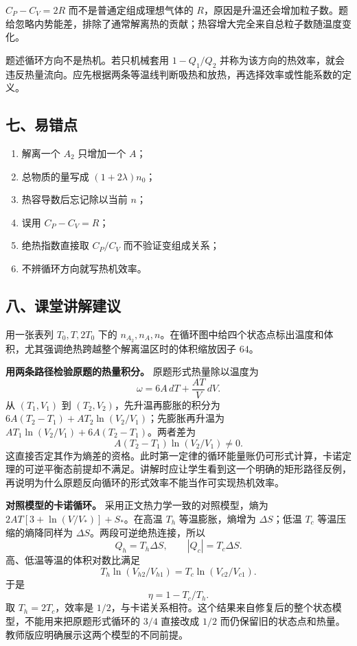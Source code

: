 \documentclass[12pt,a4paper,UTF8]{ctexart}
\newcommand{\tightlist}{\setlength{\itemsep}{0pt}\setlength{\parskip}{0pt}}
\begin{document}
\(C_P-C_V=2R\) 而不是普通定组成理想气体的
\(R\)，原因是升温还会增加粒子数。题给忽略内势能差，排除了通常解离热的贡献；热容增大完全来自总粒子数随温度变化。

题述循环方向不是热机。若只机械套用 \(1-Q_1/Q_2\)
并称为该方向的热效率，就会违反热量流向。应先根据两条等温线判断吸热和放热，再选择效率或性能系数的定义。

\subsection{七、易错点}\label{ux4e03ux6613ux9519ux70b9-5}

\begin{enumerate}
\def\labelenumi{\arabic{enumi}.}
\tightlist
\item
  解离一个 \(A_2\) 只增加一个 \(A\)；
\item
  总物质的量写成 \((1+2\lambda)n_0\)；
\item
  热容导数后忘记除以当前 \(n\)；
\item
  误用 \(C_P-C_V=R\)；
\item
  绝热指数直接取 \(C_P/C_V\) 而不验证变组成关系；
\item
  不辨循环方向就写热机效率。
\end{enumerate}

\subsection{八、课堂讲解建议}\label{ux516bux8bfeux5802ux8bb2ux89e3ux5efaux8bae-5}

用一张表列 \(T_0,T,2T_0\) 下的
\(n_{A_2},n_A,n\)。在循环图中给四个状态点标出温度和体积，尤其强调绝热跨越整个解离温区时的体积缩放因子
\(64\)。

\textbf{用两条路径检验原题的热量积分。} 原题形式热量除以温度为 \[
\omega=6A\,dT+\frac{AT}{V}\,dV.
\] 从 \((T_1,V_1)\) 到 \((T_2,V_2)\)，先升温再膨胀的积分为
\(6A(T_2-T_1)+AT_2\ln(V_2/V_1)\)；先膨胀再升温为
\(AT_1\ln(V_2/V_1)+6A(T_2-T_1)\)。两者差为 \[
A(T_2-T_1)\ln(V_2/V_1)\ne0.
\]
这直接否定其作为熵差的资格。此时第一定律的循环能量账仍可形式计算，卡诺定理的可逆平衡态前提却不满足。讲解时应让学生看到这一个明确的矩形路径反例，再说明为什么原题反向循环的形式效率不能当作可实现热机效率。

\textbf{对照模型的卡诺循环。} 采用正文热力学一致的对照模型，熵为
\(2AT[3+\ln(V/V_*)]+S_*\)。在高温 \(T_h\) 等温膨胀，熵增为
\(\Delta S\)；低温 \(T_c\) 等温压缩的熵降同样为
\(\Delta S\)。两段可逆绝热连接，所以 \[
Q_h=T_h\Delta S,\qquad |Q_c|=T_c\Delta S.
\] 高、低温等温的体积对数比满足 \[
T_h\ln(V_{h2}/V_{h1})
=T_c\ln(V_{c2}/V_{c1}).
\] 于是 \[
\boxed{\eta=1-T_c/T_h}.
\] 取 \(T_h=2T_c\)，效率是
\(1/2\)，与卡诺关系相符。这个结果来自修复后的整个状态模型，不能用来把原题形式循环的
\(3/4\) 直接改成 \(1/2\)
而仍保留旧的状态点和热量。教师版应明确展示这两个模型的不同前提。
\end{document}
